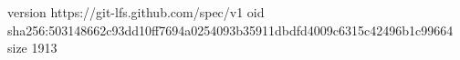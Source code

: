 version https://git-lfs.github.com/spec/v1
oid sha256:503148662c93dd10ff7694a0254093b35911dbdfd4009c6315c42496b1c99664
size 1913
